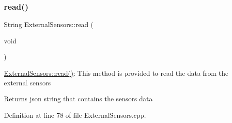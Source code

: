 \subsubsection{\texorpdfstring{read()}{read()}}
{\footnotesize\ttfamily String External\+Sensors\+::read (\begin{DoxyParamCaption}\item[{void}]{ }\end{DoxyParamCaption})}

\hyperlink{class_external_sensors_a53177b81eca3be89508b5511ddcd00fc}{External\+Sensors\+::read()}\+: This method is provided to read the data from the external sensors

\begin{DoxyReturn}{Returns}
json string that contains the sensors data 
\end{DoxyReturn}


Definition at line 78 of file External\+Sensors.\+cpp.


